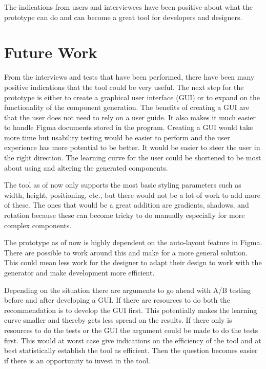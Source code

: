 The indications from users and interviewees have been positive about what the prototype can do and can become a great tool for developers and designers.

\section{Future Work}%
\label{sub:Future Work}

From the interviews and tests that have been performed, there have been many positive indications that the tool could be very useful. The next step for the prototype is either to create a graphical user interface (GUI) or to expand on the functionality of the component generation. The benefits of creating a GUI are that the user does not need to rely on a user guide. It also makes it much easier to handle Figma documents stored in the program. Creating a GUI would take more time but usability testing would be easier to perform and the user experience has more potential to be better. It would be easier to steer the user in the right direction. The learning curve for the user could be shortened to be most about using and altering the generated components. 

The tool as of now only supports the most basic styling parameters such as width, height, positioning, etc., but there would not be a lot of work to add more of these. The ones that would be a great addition are gradients, shadows, and rotation because these can become tricky to do manually especially for more complex components. 

The prototype as of now is highly dependent on the auto-layout feature in Figma. There are possible to work around this and make for a more general solution. This could mean less work for the designer to adapt their design to work with the generator and make development more efficient. 

Depending on the situation there are arguments to go ahead with A/B testing before and after developing a GUI. If there are resources to do both the recommendation is to develop the GUI first. This potentially makes the learning curve smaller and thereby gets less spread on the results. If there only is resources to do the tests or the GUI the argument could be made to do the tests first. This would at worst case give indications on the efficiency of the tool and at best statistically establish the tool as efficient. Then the question becomes easier if there is an opportunity to invest in the tool.

